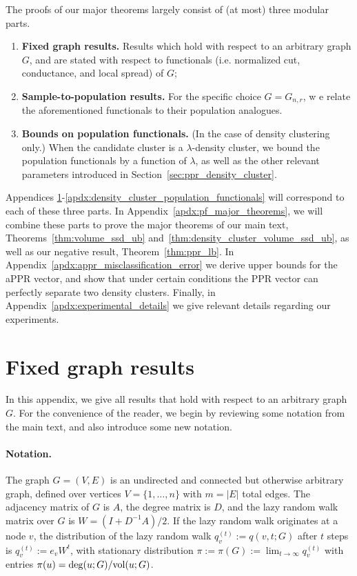 \noindent The proofs of our major theorems largely consist of (at most) three modular parts.
\begin{enumerate}
	\item \textbf{Fixed graph results.} Results which hold with respect to an arbitrary graph $G$, and are stated with respect to functionals (i.e. normalized cut, conductance, and local spread) of $G$;
	\item \textbf{Sample-to-population results.} For the specific choice $G = G_{n,r}$, w  e relate the aforementioned functionals to their population analogues. 
	\item \textbf{Bounds on population functionals.} (In the case of density clustering only.) When the candidate cluster is a $\lambda$-density cluster, we bound the population functionals by a function of $\lambda$, as well as the other relevant parameters introduced in Section~\ref{sec:ppr_density_cluster}.
\end{enumerate}

Appendices \ref{apdx:fixed_graph}-\ref{apdx:density_cluster_population_functionals} will correspond to each of these three parts. In Appendix~\ref{apdx:pf_major_theorems}, we will combine these parts to prove the major theorems of our main text, Theorems~\ref{thm:volume_ssd_ub} and~\ref{thm:density_cluster_volume_ssd_ub}, as well as our negative result, Theorem~\ref{thm:ppr_lb}. In Appendix~\ref{apdx:appr_misclassification_error} we derive upper bounds for the aPPR vector, and show that under certain conditions the PPR vector can perfectly separate two density clusters. Finally, in Appendix~\ref{apdx:experimental_details} we give relevant details regarding our experiments.

\section{Fixed graph results}
\label{apdx:fixed_graph}
In this appendix, we give all results that hold with respect to an arbitrary graph $G$. For the convenience of the reader, we begin by reviewing some notation from the main text, and also introduce some new notation. 

\paragraph{Notation.}
The graph $G = (V,E)$ is an undirected and connected but otherwise arbitrary graph, defined over vertices $V = \{1,\ldots,n\}$ with $m = |E|$ total edges. The adjacency matrix of $G$ is $A$, the degree matrix is $D$, and the lazy random walk matrix over $G$ is $W = (I + D^{-1}A)/2$. If the lazy random walk originates at a node $v$, the distribution of the lazy random walk $q_v^{(t)} := q(v,t;G)$ after $t$ steps is $q_v^{(t)} := e_v W^t$, with stationary distribution $\pi := \pi(G) := \lim_{t \to \infty} q_v^{(t)}$ with entries $\pi(u) = \deg(u;G)/\mathrm{vol}(u;G)$.

